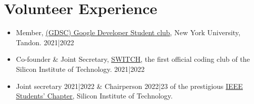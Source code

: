 \documentclass[letterpaper,10pt]{article}
\newcommand{\resumeItem}[1]{
  \item\small{
    {#1 \vspace{-2pt}}
  }
}
\newcommand{\resumeSubItem}[1]{\resumeItem{#1}\vspace{-4pt}}
\newcommand{\resumeSubHeadingListStart}{\begin{itemize}[leftmargin=0.15in, label={}]}
\newcommand{\resumeSubHeadingListEnd}{\end{itemize}}
\begin{document}
\section{Volunteer Experience}
  \resumeSubHeadingListStart
  \resumeSubItem
      {Member, \href{https://www.linkedin.com/company/gdsc-nyu-tandon/}{\underline{(GDSC) Google Developer Student club}}, New York University, Tandon.  2021|2022}
    \resumeSubItem
      {Co-founder \& Joint Secretary, \href{https://www.linkedin.com/company/switch-sit/}{\underline{SWITCH}}, the first official coding club of the Silicon Institute of Technology. 2021|2022}
    \resumeSubItem
      {Joint secretary 2021|2022 \& Chairperson 2022|23 of the prestigious \href{https://www.instagram.com/ieeesitbbsr/}{\underline{IEEE Students’ Chapter}}, Silicon Institute of Technology.}
  \resumeSubHeadingListEnd
\end{document}
